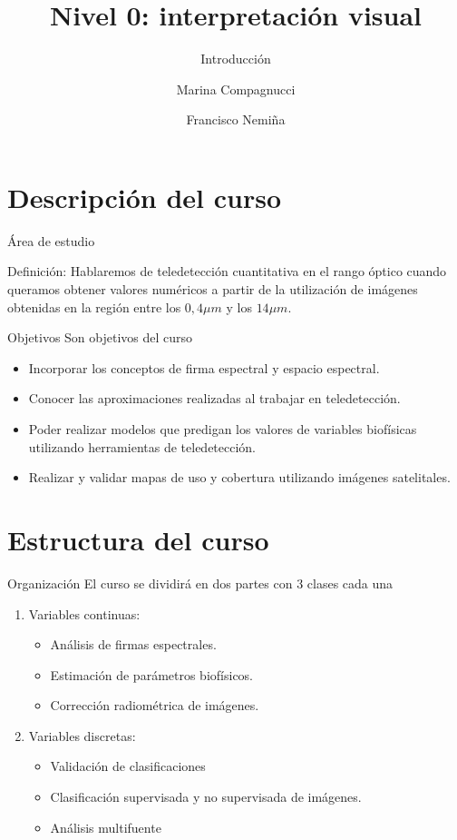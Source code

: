 \documentclass[]{beamer}
\author{Marina Compagnucci \and Francisco Nemiña}
\title{Nivel 0: interpretación visual}
\subtitle{Introducción}
\institute{Unidad de Educación y Formación Masiva \\ Comisión Nacional de Actividades Espaciales}
\date{}
\begin{document}
\maketitle
\section{Descripción del curso}

\begin{frame}{Área de estudio}
    \begin{block}{Definición:}
        Hablaremos de teledetección cuantitativa en el rango óptico cuando queramos obtener valores numéricos a partir de la utilización de imágenes obtenidas en la región entre los $0,4\mu m$ y los $14\mu m$.
    \end{block}
\end{frame}

\begin{frame}{Objetivos}
    Son objetivos del curso
    \begin{itemize}[<+->]
        \item Incorporar los conceptos de firma espectral y espacio espectral.
        \item Conocer las aproximaciones realizadas al trabajar en teledetección.
        \item Poder realizar modelos que predigan los valores de variables biofísicas utilizando herramientas de teledetección.
        \item Realizar y validar mapas de uso y cobertura utilizando imágenes satelitales.
    \end{itemize}
\end{frame}

\section{Estructura del curso}
\begin{frame}{Organización}
    El curso se dividirá en dos partes con 3 clases cada una
    \begin{enumerate}[<+->]
        \item Variables continuas:
        \begin{itemize}[<+->]
            \item Análisis de firmas espectrales.
            \item Estimación de parámetros biofísicos.
            \item Corrección radiométrica de imágenes.
        \end{itemize}
        \item Variables discretas:
        \begin{itemize}[<+->]
            \item Validación de clasificaciones
            \item Clasificación supervisada y no supervisada de imágenes.
            \item Análisis multifuente
        \end{itemize}
    \end{enumerate}
\end{frame}
\end{document}
